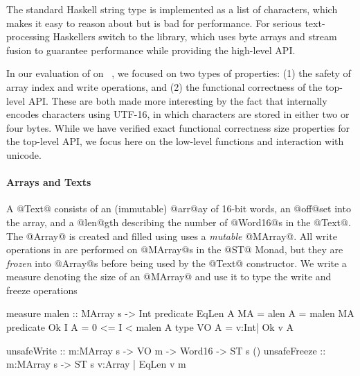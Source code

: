 The standard Haskell string type is implemented as a list of
characters, which makes it easy to reason about but is bad for
performance. For serious text-processing Haskellers switch to 
the \libtext library, which uses byte arrays and stream fusion to
guarantee performance while providing the high-level API.

In our evaluation of \toolname on \libtext~\cite{text}, 
we focused on two types of properties: 
(1) the safety of array index and write operations, and 
(2) the functional correctness of the top-level API.
%
These are both made more interesting by the fact that 
\libtext internally encodes characters using UTF-16, 
in which characters are stored in either two or four bytes.
%
While we have verified exact functional correctness size 
properties for the top-level API, we focus here on the 
low-level functions and interaction with unicode.

\paragraph{Arrays and Texts}
A @Text@ consists of an (immutable) @arr@ay of 16-bit words,
an @off@set into the array, and a @len@gth describing the 
number of @Word16@s in the @Text@.  
The @Array@ is created and filled using uses a 
\emph{mutable} @MArray@. 
All write operations in \libtext are performed on @MArray@s 
in the @ST@ Monad, but they are \emph{frozen} into @Array@s 
before being used by the @Text@ constructor.
%
We write a measure denoting the size of an @MArray@ and use
it to type the write and freeze operations
%
\begin{code}
measure malen       :: MArray s -> Int
predicate EqLen A MA = alen A = malen MA
predicate Ok I A     = 0 <= I < malen A
type VO A            = {v:Int| Ok v A} 

unsafeWrite  :: m:MArray s
             -> VO m -> Word16 -> ST s ()
unsafeFreeze :: m:MArray s
             -> ST s {v:Array | EqLen v m}
\end{code}

